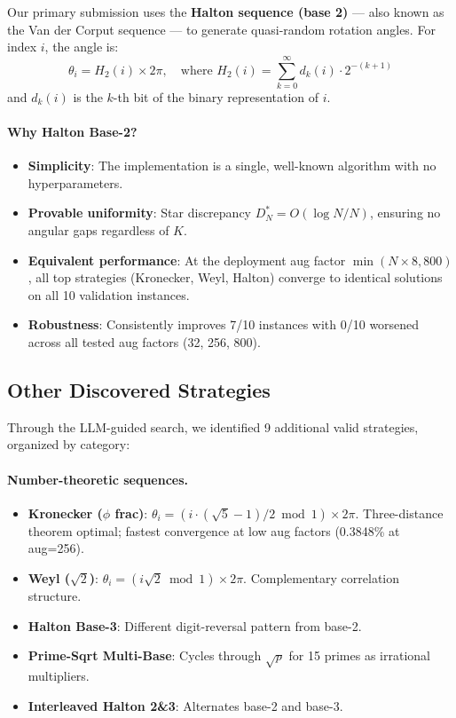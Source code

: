 \documentclass[11pt,a4paper]{article}
\begin{document}
Our primary submission uses the \textbf{Halton sequence (base 2)} --- also
known as the Van der Corput sequence --- to generate quasi-random rotation
angles. For index $i$, the angle is:
\begin{equation}
  \theta_i = H_2(i) \times 2\pi, \quad \text{where } H_2(i) = \sum_{k=0}^{\infty} d_k(i) \cdot 2^{-(k+1)}
  \label{eq:halton_angle}
\end{equation}
and $d_k(i)$ is the $k$-th bit of the binary representation of $i$.

\paragraph{Why Halton Base-2?}
\begin{itemize}
  \item \textbf{Simplicity}: The implementation is a single, well-known
        algorithm with no hyperparameters.
  \item \textbf{Provable uniformity}: Star discrepancy
        $D_N^* = O(\log N / N)$, ensuring no angular gaps regardless of $K$.
  \item \textbf{Equivalent performance}: At the deployment aug factor
        $\min(N{\times}8, 800)$, all top strategies (Kronecker, Weyl, Halton)
        converge to identical solutions on all 10 validation instances.
  \item \textbf{Robustness}: Consistently improves 7/10 instances with 0/10
        worsened across all tested aug factors (32, 256, 800).
\end{itemize}

\subsection{Other Discovered Strategies}

Through the LLM-guided search, we identified 9 additional valid strategies,
organized by category:

\paragraph{Number-theoretic sequences.}
\begin{itemize}
  \item \textbf{Kronecker ($\phi$ frac)}: $\theta_i = (i \cdot (\sqrt{5}-1)/2
        \bmod 1) \times 2\pi$. Three-distance theorem optimal; fastest
        convergence at low aug factors (0.3848\% at aug=256).
  \item \textbf{Weyl ($\sqrt{2}$)}: $\theta_i = (i\sqrt{2} \bmod 1) \times
        2\pi$. Complementary correlation structure.
  \item \textbf{Halton Base-3}: Different digit-reversal pattern from base-2.
  \item \textbf{Prime-Sqrt Multi-Base}: Cycles through $\sqrt{p}$ for 15
        primes as irrational multipliers.
  \item \textbf{Interleaved Halton 2\&3}: Alternates base-2 and base-3.
\end{itemize}
\end{document}
